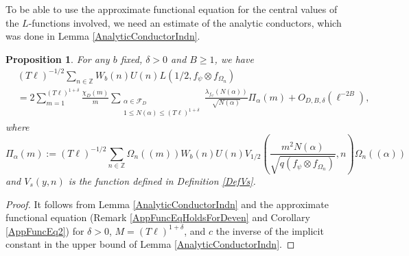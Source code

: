 \documentclass[11pt]{amsart}
\newcommand{\Z}{\mathbb{Z}}
\newtheorem{proposition}[theorem]{Proposition}
\theoremstyle{definition}
\theoremstyle{remark}
\begin{document}
To be able to use the approximate functional equation for the central values of the $L$-functions involved, we need an estimate of the analytic conductors, which was done in Lemma \ref{AnalyticConductorIndn}.

\begin{proposition}
For any $b$ fixed, $\delta>0$ and $B\geq 1$, we have
\begin{align}
    &(T\ell)^{-1/2}\sum_{n\in \Z} W_{b}(n) U(n) L(1/2,f_{\psi}\otimes f_{\Omega_n}) \label{MainBound4} \\
    &= 2\sum_{m=1}^{(T\ell)^{1+\delta}} \frac{\chi_{D}(m)}{m} \sum_{\substack{\alpha \in \mathcal{F}_{D} \\ 1\leq N(\alpha) \leq (T\ell)^{1+\delta}}} \frac{\lambda_{f_{\psi}}(N(\alpha))}{\sqrt{N(\alpha)}} \Pi_{\alpha}(m) + O_{D,B,\delta}\left(\ell^{-2B}\right), \nonumber
\end{align}
where $$ \Pi_{\alpha}(m) := (T\ell)^{-1/2}\sum_{n\in \Z} \Omega_n((m)) W_{b}(n) U(n) V_{1/2}\left(\frac{m^2 N(\alpha)}{\sqrt{q(f_{\psi}\otimes f_{\Omega_n})}},n\right) \Omega_n((\alpha))$$ and $V_{s}(y,n)$ is the function defined in Definition \ref{DefVs}.
\end{proposition}

\begin{proof}
It follows from Lemma \ref{AnalyticConductorIndn} and the approximate functional equation (Remark \ref{AppFuncEqHoldsForDeven} and Corollary \ref{AppFuncEq2}) for $\delta>0$, $M=(T\ell)^{1+\delta}$, and $c$ the inverse of the implicit constant in the upper bound of Lemma \ref{AnalyticConductorIndn}.
\end{proof}
\end{document}

